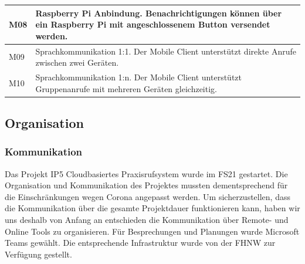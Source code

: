 \begin{table}[h]
\begin{tabular}{|l|p{15cm}|}
        \hline
        M08         & Raspberry Pi Anbindung. Benachrichtigungen können über ein Raspberry Pi mit angeschlossenem Button versendet werden. \\
        \hline
        M09         & Sprachkommunikation 1:1. Der Mobile Client unterstützt direkte Anrufe zwischen zwei Geräten. \\
        \hline
        M10         & Sprachkommunikation 1:n. Der Mobile Client unterstützt Gruppenanrufe mit mehreren Geräten gleichzeitig. \\
        \hline
    \end{tabular}\label{tab:milestones}
\end{table}
\clearpage

\subsection{Organisation}\label{subsec:organisation}

\subsubsection*{Kommunikation}

Das Projekt IP5 Cloudbasiertes Praxisrufsystem wurde im FS21 gestartet. Die Organisation und Kommunikation des Projektes mussten dementsprechend für die Einschränkungen wegen Corona angepasst werden.
Um sicherzustellen, dass die Kommunikation über die gesamte Projektdauer funktionieren kann, haben wir uns deshalb von Anfang an entschieden die Kommunikation über Remote- und Online Tools zu organisieren.
Für Besprechungen und Planungen wurde Microsoft Teams gewählt. Die entsprechende Infrastruktur wurde von der FHNW zur Verfügung gestellt.
